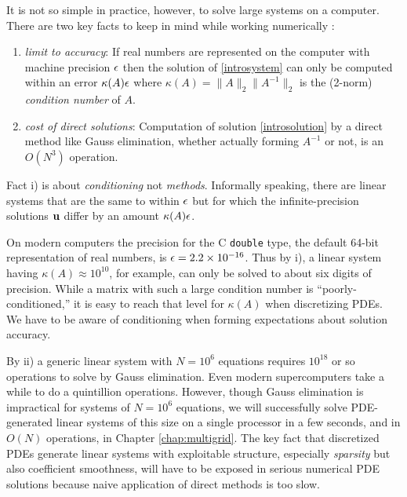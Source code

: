 It is not so simple in practice, however, to solve large systems on a computer.  There are two key facts to keep in mind while working numerically  \citep{TrefethenBau}:
\renewcommand{\labelenumi}{\roman{enumi})}
\begin{enumerate}
\item \label{limittoaccuracy} \emph{limit to accuracy}:  If real numbers are represented on the computer with machine precision $\epsilon$ then the solution of \eqref{introsystem} can only be computed within an error $\kappa(A) \epsilon$ where $\kappa(A) = \|A\|_2 \|A^{-1}\|_2$ is the (2-norm) \emph{condition number} of $A$.
\item \emph{cost of direct solutions}:  Computation of solution \eqref{introsolution} by a direct method like Gauss elimination, whether actually forming $A^{-1}$ or not, is an $O(N^3)$ operation.
\end{enumerate}

Fact i) is about \emph{conditioning} not \emph{methods}.  Informally speaking, there are linear systems that are the same to within $\epsilon$ but for which the infinite-precision solutions $\mathbf{u}$ differ by an amount $\kappa(A) \epsilon$.

On modern computers the precision for the C \texttt{double} type, the default 64-bit representation of real numbers, is $\epsilon = 2.2 \times 10^{-16}$.  Thus by i), a linear system having $\kappa(A) \approx 10^{10}$, for example, can only be solved to about six digits of precision.  While a matrix with such a large condition number is ``poorly-conditioned,'' it is easy to reach that level for $\kappa(A)$ when discretizing PDEs.  We have to be aware of conditioning when forming expectations about solution accuracy.

By ii) a generic linear system with $N=10^6$ equations requires $10^{18}$ or so operations to solve by Gauss elimination.  Even modern supercomputers take a while to do a quintillion operations.  However, though Gauss elimination is impractical for systems of $N=10^6$ equations, we will successfully solve PDE-generated linear systems of this size on a single processor in a few seconds, and in $O(N)$ operations, in Chapter \ref{chap:multigrid}.  The key fact that discretized PDEs generate linear systems with exploitable structure, especially \emph{sparsity} but also coefficient smoothness, will have to be exposed in serious numerical PDE solutions because naive application of direct methods is too slow.


